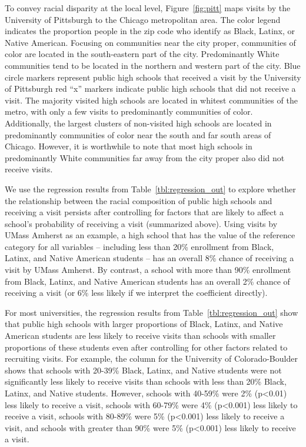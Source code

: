 \documentclass[twoside]{article}
\begin{document}
To convey racial disparity at the local level, Figure~\ref{fig:pitt} maps visits by the University of Pittsburgh to the Chicago metropolitan area.  The color legend indicates the proportion people in the zip code who identify as Black, Latinx, or Native American. Focusing on communities near the city proper, communities of color are located in the south-eastern part of the city. Predominantly White communities tend to be located in the northern and western part of the city. Blue circle markers represent public high schools that received a visit by the University of Pittsburgh red ``x'' markers indicate public high schools that did not receive a visit. The majority visited high schools are located in whitest communities of the metro, with only a few visits to predominantly communities of color. Additionally, the largest clusters of non-visited high schools are located in predominantly communities of color near the south and far south areas of Chicago. However, it is worthwhile to note that most high schools in predominantly White communities far away from the city proper also did not receive visits.

We use the regression results from Table~\ref{tbl:regression_out} to explore whether the relationship between the racial composition of public high schools and receiving a visit persists after controlling for factors that are likely to affect a school's probability of receiving a visit (summarized above). Using visits by UMass Amherst as an example, a high school that has the value of the reference category for all variables -- including less than 20\% enrollment from Black, Latinx, and Native American students -- has an overall 8\% chance of receiving a visit by UMass Amherst. By contrast, a school with more than 90\% enrollment from Black, Latinx, and Native American students has an overall 2\% chance of receiving a visit (or 6\% less likely if we interpret the coefficient directly).

For most universities, the regression results from Table~\ref{tbl:regression_out} show that public high schools with larger proportions of Black, Latinx, and Native American students are less likely to receive visits than schools with smaller proportions of these students even after controlling for other factors related to recruiting visits. For example, the column for the University of Colorado-Boulder shows that schools with 20-39\% Black, Latinx, and Native students were not significantly less likely to receive visits than schools with less than 20\% Black, Latinx, and Native students.  However, schools with 40-59\% were 2\% (p<0.01) less likely to receive a visit, schools with 60-79\% were 4\% (p<0.001) less likely to receive a visit, schools with 80-89\% were 5\% (p<0.001) less likely to receive a visit, and schools with greater than 90\% were 5\% (p<0.001) less likely to receive a visit.
\end{document}

